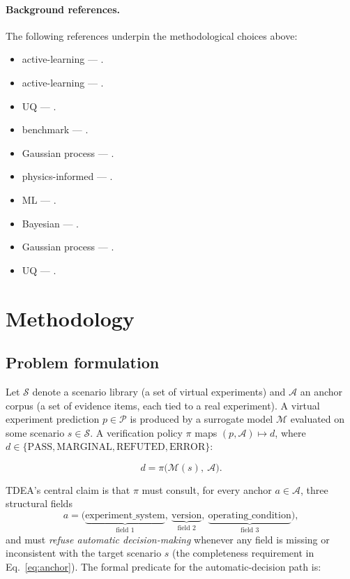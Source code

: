\documentclass[review,3p]{elsarticle}
\begin{document}
\paragraph{Background references.} The following references underpin the methodological choices above:
\begin{itemize}
    \item active-learning — \cite{bingham2007sample}.
    \item active-learning — \cite{burtini2016active}.
    \item UQ — \cite{hollister2016uncertainty}.
    \item benchmark — \cite{jaimovitch2021comparative}.
    \item Gaussian process — \cite{jones1998gpego}.
    \item physics-informed — \cite{karniadakis2021physics}.
    \item ML — \cite{kutz2022ml}.
    \item Bayesian — \cite{mackay1992bayesian}.
    \item Gaussian process — \cite{murray2020gpmachine}.
    \item UQ — \cite{wang2021uq}.
\end{itemize}

\section{Methodology}
\label{sec:method}

\subsection{Problem formulation}
\label{sec:problem}

Let $\mathcal{S}$ denote a scenario library (a set of virtual experiments) and $\mathcal{A}$ an anchor corpus (a set of evidence items, each tied to a real experiment). A virtual experiment prediction $p \in \mathcal{P}$ is produced by a surrogate model $\mathcal{M}$ evaluated on some scenario $s \in \mathcal{S}$. A verification policy $\pi$ maps $(p, \mathcal{A}) \mapsto d$, where $d \in \{\text{PASS}, \text{MARGINAL}, \text{REFUTED}, \text{ERROR}\}$:

\begin{equation}
    d = \pi\bigl( \mathcal{M}(s),\ \mathcal{A} \bigr).
\end{equation}

TDEA's central claim is that $\pi$ must consult, for every anchor $a \in \mathcal{A}$, three structural fields
\begin{equation}
    a = \bigl(\underbrace{\text{experiment\_system}}_{\text{field 1}},\ \underbrace{\text{version}}_{\text{field 2}},\ \underbrace{\text{operating\_condition}}_{\text{field 3}}\bigr),
    \label{eq:anchor}  %
\end{equation}
and must \emph{refuse automatic decision-making} whenever any field is missing or inconsistent with the target scenario $s$ (the completeness requirement in Eq.~\eqref{eq:anchor}). The formal predicate for the automatic-decision path is:
\end{document}
